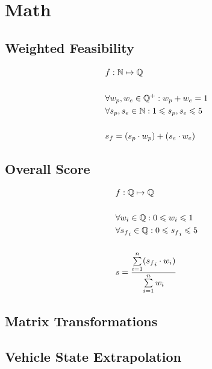 \chapter{Math}\label{ax:math}

\section{Weighted Feasibility}\label{ax:math:feasibility}

\begin{align*}
    &f: \mathbb{N} \mapsto \mathbb{Q} \\
    \\
    &\forall w_p,w_e \in \mathbb{Q}^+: w_p + w_e = 1 \\
    &\forall s_p,s_e \in \mathbb{N}: 1 \leqslant s_p,s_e \leqslant 5 \\
    \\
    &s_f = (s_p \cdot w_p) + (s_e \cdot w_e) \\
\end{align*}

\section{Overall Score}\label{ax:math:mean}

\begin{align*}
    &f: \mathbb{Q} \mapsto \mathbb{Q} \\
    \\
    &\forall w_i \in \mathbb{Q}:0 \leqslant w_i \leqslant 1 \\
    &\forall {s_f}_i \in \mathbb{Q}:0 \leqslant {s_f}_i \leqslant 5 \\
    \\
    &s = \frac{\sum\limits_{i=1}^{n}({s_f}_i \cdot w_i)}{\sum\limits_{i=1}^{n}w_i} \\
\end{align*}

\section{Matrix Transformations}\label{ax:math:matrix}


\section{Vehicle State Extrapolation}\label{ax:math:extrapolation}

